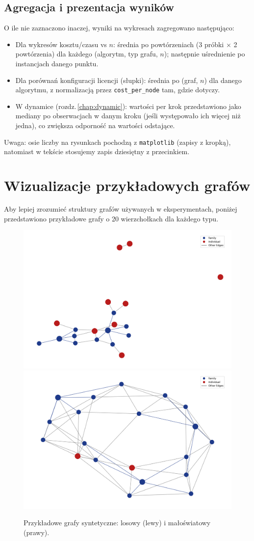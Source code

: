 \subsection{Agregacja i prezentacja wyników}

O ile nie zaznaczono inaczej, wyniki na wykresach zagregowano następująco:
\begin{itemize}
  \item Dla wykresów kosztu/czasu vs \(n\): średnia po powtórzeniach (3 próbki × 2 powtórzenia) dla każdego (algorytm, typ grafu, \(n\)); następnie uśrednienie po instancjach danego punktu.
  \item Dla porównań konfiguracji licencji (słupki): średnia po (graf, \(n\)) dla danego algorytmu, z normalizacją przez \texttt{cost\_per\_node} tam, gdzie dotyczy.
  \item W dynamice (rozdz.\,\ref{chap:dynamic}): wartości per krok przedstawiono jako mediany po obserwacjach w danym kroku (jeśli występowało ich więcej niż jedna), co zwiększa odporność na wartości odstające.
\end{itemize}
Uwaga: osie liczby na rysunkach pochodzą z \texttt{matplotlib} (zapisy z kropką), natomiast w tekście stosujemy zapis dziesiętny z przecinkiem.

\section{Wizualizacje przykładowych grafów}

Aby lepiej zrozumieć struktury grafów używanych w eksperymentach, poniżej przedstawiono przykładowe grafy o 20 wierzchołkach dla każdego typu.

\begin{figure}[H]
  \centering
  \includegraphics[width=0.48\linewidth]{assets/figures/graph_random_20.png}
  \includegraphics[width=0.48\linewidth]{assets/figures/graph_small_world_20.png}
  \caption{Przykładowe grafy syntetyczne: losowy (lewy) i małoświatowy (prawy).}
  \label{fig:graphs_synthetic}
\end{figure}

